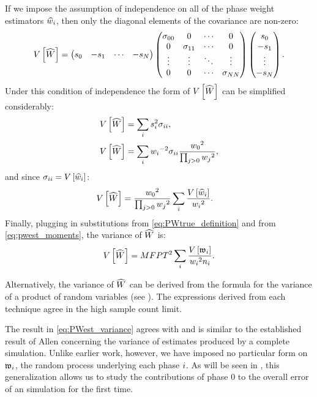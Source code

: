 If we impose the assumption of independence on all of the phase weight estimators $\widehat{w}_{i}$, then only the diagonal elements of the covariance are non-zero:
    \begin{equation*}
        V \left[ \widehat{W} \right] =
        \begin{pmatrix}
            s_0 & -s_1 & \cdots & -s_{N}
        \end{pmatrix}
        \begin{pmatrix}
            \sigma_{00} & 0           & \cdots & 0           \\
            0           & \sigma_{11} & \cdots & 0           \\
            \vdots      & \vdots      & \ddots & \vdots      \\
            0           & 0           & \cdots & \sigma_{N N}
        \end{pmatrix}
        \begin{pmatrix}
            s_0    \\ 
            -s_1    \\
            \vdots \\ 
            -s_{N}
        \end{pmatrix}.
    \end{equation*}
Under this condition of independence the form of $V \left[ \widehat{W} \right]$ can be simplified considerably:
    \begin{align*}
        V \left[ \widehat{W} \right] &= \sum_i s_i^2 \sigma_{ii}, \\
        V \left[ \widehat{W} \right] &= \sum_i w_{i} {}^{-2} \sigma_{ii} \frac{w_{0} {}^2}{\prod_{j>0} w_{j} {}^2},
    \end{align*}
and since $\sigma_{ii} = V \left[ \widehat{w}_{i} \right]$:
    \begin{align*}
        V \left[ \widehat{W} \right] &= \frac{w_{0} {}^2}{\prod_{j>0} w_{j} {}^2} \sum_i \frac{V \left[ \widehat{w}_{i} \right]}{w_{i} {}^2}.
    \end{align*}
Finally, plugging in substitutions from \eqref{eq:PWtrue_definition} and from \eqref{eq:pwest_moments}, the variance of $\widehat{W}$ is:    
    \begin{equation}\label{eq:PWest_variance}
        V \left[ \widehat{W} \right] = MFPT^2 \sum_i \frac{V \left[ \mathfrak{w}_{i} \right]}{w_{i} {}^2 n_i}.
    \end{equation}

Alternatively, the variance of $\widehat{W}$ can be derived from the formula for the variance of a product of random variables (see ). The expressions derived from each technique agree in the high sample count limit.

The result in \eqref{eq:PWest_variance} agrees with and is similar to the established result of Allen {\etal}\supercite{Allen:2006ch} concerning the variance of estimates produced by a complete  simulation. Unlike earlier work, however, we have imposed no particular form on $\mathfrak{w}_{i}$, the random process underlying each phase $i$. As will be seen in , this generalization allows us to study the contributions of phase 0 to the overall error of an  simulation for the first time.

